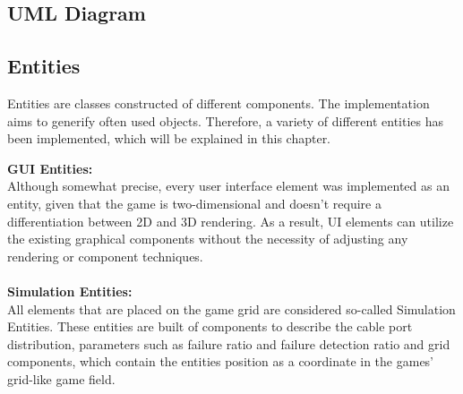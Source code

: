 \begin{center}
\end{center}

\subsection{UML Diagram}\label{subsec:uml-diagram}

\subsection{Entities}\label{subsec:entities}
Entities are classes constructed of different components.
The implementation aims to generify often used objects.
Therefore, a variety of different entities has been implemented, which will be explained in this chapter.

\textbf{GUI Entities:} \\
Although somewhat precise, every user interface element was implemented as an entity, given that the game is two-dimensional and doesn't require a differentiation between 2D and 3D rendering.
As a result, UI elements can utilize the existing graphical components without the necessity of adjusting any rendering or component techniques.
\\ \\
\textbf{Simulation Entities:} \\
All elements that are placed on the game grid are considered so-called Simulation Entities.
These entities are built of components to describe the cable port distribution, parameters such as failure ratio and failure detection ratio and grid components, which contain the
entities position as a coordinate in the games' grid-like game field.


